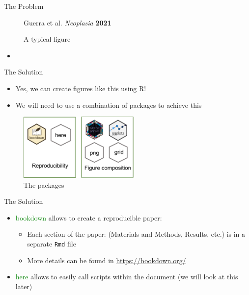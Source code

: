 \documentclass[
  ignorenonframetext,
]{beamer}
\providecommand{\tightlist}{%
  \setlength{\itemsep}{0pt}\setlength{\parskip}{0pt}}\usepackage{longtable,booktabs,array}
\begin{document}
\begin{frame}{The Problem}
\protect\hypertarget{the-problem-1}{}
\begin{figure}
\centering
\caption{A typical figure}
                {\tiny{Guerra et al.} \textit{Neoplasia} \textbf{2021}}
    \end{figure}

\begin{itemize}[<+->]
\item
  \color{red}{Can figures like this be created using `RMarkdown`?}
\end{itemize}
\end{frame}

\begin{frame}{The Solution}
\protect\hypertarget{the-solution}{}
\begin{itemize}[<+->]
\item
  Yes, we can create figures like this using R!
\item
  We will need to use a combination of packages to achieve this
\end{itemize}

\begin{figure}
\centering
\caption{The packages}
\includegraphics[width=6cm]{figures/R_packages.png}
\end{figure}
\end{frame}

\begin{frame}[fragile]{The Solution}
\protect\hypertarget{the-solution-1}{}
\begin{itemize}[<+->]
\tightlist
\item
  \textcolor{green}{{bookdown}} allows to create a reproducible paper:

  \begin{itemize}[<+->]
  \tightlist
  \item
    Each section of the paper: (Materials and Methods, Results, etc.) is
    in a separate \texttt{Rmd} file
  \item
    More details can be found in \url{https://bookdown.org/}
  \end{itemize}
\item
  \textcolor{green}{{here}} allows to easily call scripts within the
  document (we will look at this later)
\end{itemize}
\end{frame}
\end{document}
